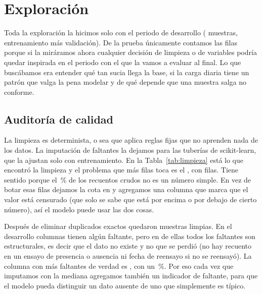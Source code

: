 \section{Exploración}
\label{sec:exploracion}

Toda la exploración la hicimos solo con el periodo de desarrollo
(\ExpMuestrasDesarrollo{} muestras, entrenamiento más validación). De la
prueba únicamente contamos las filas porque si la miráramos ahora cualquier
decisión de limpieza o de variables podría quedar inspirada en el periodo con
el que la vamos a evaluar al final. Lo que buscábamos era entender qué tan
sucia llega la base, si la carga diaria tiene un patrón que valga la pena
modelar y de qué depende que una muestra salga no conforme.

\subsection{Auditoría de calidad}

La limpieza es determinista, o sea que aplica reglas fijas que no aprenden
nada de los datos. La imputación de faltantes la dejamos para las tuberías de
scikit-learn, que la ajustan solo con entrenamiento. En la
Tabla~\ref{tab:limpieza} está lo que encontró la limpieza y el problema que
más filas toca es el \ExpProblemaMayor{}, con \ExpProblemaMayorFilas{} filas.
Tiene sentido porque el \DatRecuentosNoNumericosPct{}\,\% de los recuentos
crudos no es un número simple. En vez de botar esas filas dejamos
la cota en  y agregamos una columna que marca que el
valor está censurado (que solo se sabe que está por encima o por debajo de
cierto número), así el modelo puede usar las dos cosas.

\begin{table}[!htbp]
\centering
{}
\caption{Correcciones de la limpieza por tipo de problema, contadas sobre las
tablas crudas: Los faltantes no aparecen porque se tratan aparte, dentro de
las tuberías de modelado.}
\label{tab:limpieza}
\end{table}

Después de eliminar \ExpDuplicadosEliminados{} duplicados exactos quedaron
\ExpMuestrasLimpias{} muestras limpias. En el desarrollo
\ExpColumnasConFaltantes{} columnas tienen algún faltante, pero en
\ExpColumnasSoloEstructural{} de ellas todos los faltantes son estructurales,
es decir que el dato no existe y no que se perdió (no hay recuento en un
ensayo de presencia o ausencia ni fecha de reensayo si no se reensayó). La
columna con más faltantes de verdad es \codigo{\ExpPeorFaltanteColumna}, con
un \ExpPeorFaltantePct{}\,\%. Por eso cada vez que imputamos con la mediana
agregamos también un indicador de faltante, para que el modelo pueda
distinguir un dato ausente de uno que simplemente es típico.

